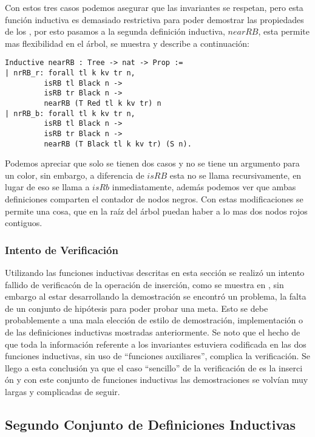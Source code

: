 Con estos tres casos podemos asegurar que las invariantes se respetan, pero esta funci\'on
inductiva es demasiado restrictiva para poder demostrar las propiedades de los {\arns}, por esto
pasamos a la segunda definici\'on inductiva, $nearRB$,  esta permite mas flexibilidad en el \'
arbol, se muestra y describe a continuaci\'on:

\begin{verbatim}
Inductive nearRB : Tree -> nat -> Prop :=
| nrRB_r: forall tl k kv tr n,
         isRB tl Black n ->
         isRB tr Black n ->
         nearRB (T Red tl k kv tr) n
| nrRB_b: forall tl k kv tr n,
         isRB tl Black n ->
         isRB tr Black n ->
         nearRB (T Black tl k kv tr) (S n).
\end{verbatim}
Podemos apreciar que solo se tienen dos casos y no se tiene un argumento para un color, sin
embargo, a diferencia de $isRB$ esta no se llama recursivamente, en lugar de eso se llama a $isRb$
inmediatamente, además podemos ver que ambas definiciones comparten el contador de nodos negros.
Con estas modificaciones se permite una cosa, que en la ra\'iz del \'arbol puedan haber a lo mas
dos nodos rojos contiguos.

\subsubsection{Intento de Verificaci\'on}
Utilizando las funciones inductivas descritas en esta secci\'on se realiz\'o un intento fallido de
verificac\'on de la operaci\'on de inserci\'on, como se muestra en \cite{appel}, sin embargo al
estar desarrollando la demostraci\'on se encontró un problema, la falta de un conjunto de
hipótesis para poder probar una meta. Esto se debe probablemente a una mala elección de estilo de
demostraci\'on, implementaci\'on o de las definiciones inductivas mostradas anteriormente. Se noto
que el hecho de que toda la informaci\'on referente a los invariantes estuviera codificada en las
dos funciones inductivas, sin uso de ``funciones auxiliares'', complica la verificaci\'on. Se
llego a esta conclusi\'on ya que el caso ``sencillo'' de la verificaci\'on de {\arns} es la inserci
\'on y con este conjunto de funciones inductivas las demostraciones se volvían muy largas y
complicadas de seguir.

\subsection{Segundo Conjunto de Definiciones Inductivas}

